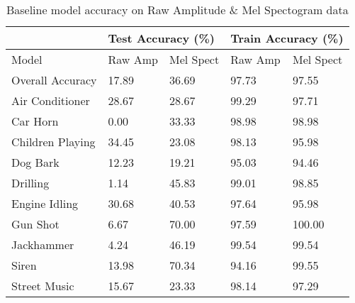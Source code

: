 \documentclass[11pt]{article}
\begin{document}
\begin{table}[h!]
\centering
\begin{tabular}{lllll}
                 & \multicolumn{2}{l}{Test Accuracy (\%)} & \multicolumn{2}{l}{Train Accuracy (\%)} \\ \toprule
Model            & Raw Amp           & Mel Spect          & Raw Amp           & Mel Spect           \\ \toprule
Overall Accuracy & 17.89             & 36.69              & 97.73             & 97.55               \\ \midrule
Air Conditioner  & 28.67             & 28.67              & 99.29             & 97.71               \\
Car Horn         & 0.00              & 33.33              & 98.98             & 98.98               \\
Children Playing & 34.45             & 23.08              & 98.13             & 95.98               \\
Dog Bark         & 12.23             & 19.21              & 95.03             & 94.46               \\
Drilling         & 1.14              & 45.83              & 99.01             & 98.85               \\
Engine Idling    & 30.68             & 40.53              & 97.64             & 95.98               \\
Gun Shot         & 6.67              & 70.00              & 97.59             & 100.00              \\
Jackhammer       & 4.24              & 46.19              & 99.54             & 99.54               \\
Siren            & 13.98             & 70.34              & 94.16             & 99.55               \\
Street Music     & 15.67             & 23.33              & 98.14             & 97.29               \\ \bottomrule
\end{tabular}
\caption{\label{tab:1} Baseline model accuracy on Raw Amplitude \& Mel Spectogram data}
\end{table}

\end{document}
